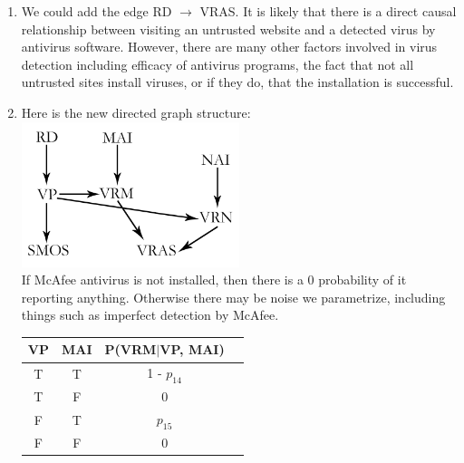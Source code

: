 \documentclass[12pt,letterpaper]{article}
\begin{document}
\begin{enumerate}[label={(\alph*) }]
\begin{minipage}{0.3\textwidth}
        \end{minipage}\qquad \\ \\ 
  
        \item  We could add the edge RD $\rightarrow$ VRAS. It is likely that there is a direct causal relationship between visiting an untrusted website and a detected virus by antivirus software. However, there are many other factors involved in virus detection including efficacy of antivirus programs, the fact that not all untrusted sites install viruses, or if they do, that the installation is successful. 
        \item Here is the new directed graph structure: \\
\includegraphics[width=2.5in]{1c.png}\\If McAfee antivirus is not installed, then there is a 0 probability of it reporting anything. Otherwise there may be noise we parametrize, including things such as imperfect detection by McAfee. \\

\begin{minipage}{0.3\textwidth}
        \begin{tabular}{c c c c} %
        \hline\hline                        %
         VP & MAI & P(VRM$|$VP, MAI) \\ [0.5ex] 
        \hline                  %
        T & T & 1 - $p_{14}$  \\ %
        T & F & 0  \\
        F & T & $p_{15}$  \\
        F & F & 0  \\  
        \hline 
        \end{tabular}

        \end{minipage}\qquad \\ \\ 
        


\end{enumerate}
\end{document}
